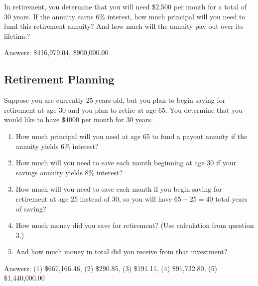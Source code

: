 \begin{exercise}
  In retirement, you determine that you will need \$2,500 per month
  for a total of 30 years. If the annuity earns 6\% interest, how much
  principal will you need to fund this retirement annuity? And how
  much will the annuity pay out over its lifetime?

  \noindent Answers: \$416,979.04, \$900,000.00
\end{exercise}

\newpage

\subsection{Retirement Planning}%
\label{sub:retirement-planning}

\begin{exercise}
  Suppose you are currently 25 years old, but you plan to begin saving
  for retirement at age 30 and you plan to retire at age 65. You
  determine that you would like to have \$4000 per month for 30 years.
  \begin{enumerate}
  \item How much principal will you need at age 65 to fund a payout
    annuity if the annuity yields 6\% interest?


  \item How much will you need to save each month beginning at age 30
    if your savings annuity yields 8\% interest?


  \item How much will you need to save each month if you begin saving
    for retirement at age 25 instead of 30, so you will have
    \(65-25=40\) total years of saving?


  \item How much money did you save for retirement? (Use calculation
    from question 3.)


  \item And how much money in total did you receive from that
    investment?


  \end{enumerate}

  \noindent Answers: (1) \$667,166.46, (2) \$290.85, (3) \$191.11,
  (4) \$91,732.80, (5) \$1,440,000.00
\end{exercise}

